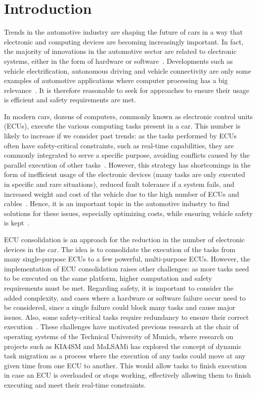 
\chapter{Introduction}\label{chap:introduction}
Trends in the automotive industry are shaping the future of cars in a way that electronic and computing devices are becoming increasingly important. In fact, the majority of innovations in the automotive sector are related to electronic systems, either in the form of hardware or software~\parencite{ey1}. Developments such as vehicle electrification, autonomous driving and vehicle connectivity are only some examples of automotive applications where computer processing has a big relevance~\parencite{pwc1}. It is therefore reasonable to seek for approaches to ensure their usage is efficient and safety requirements are met.

In modern cars, dozens of computers, commonly known as electronic control units (ECUs), execute the various computing tasks present in a car. This number is likely to increase if we consider past trends: as the tasks performed by ECUs often have safety-critical constraints, such as real-time capabilities, they are commonly integrated to serve a specific purpose, avoiding conflicts caused by the parallel execution of other tasks~\parencite{vipin1, vipin2}. However, this strategy has shortcomings in the form of inefficient usage of the electronic devices (many tasks are only executed in specific and rare situations), reduced fault tolerance if a system fails, and increased weight and cost of the vehicle due to the high number of ECUs and cables~\parencite{vipin2, baunach1}. Hence, it is an important topic in the automotive industry to find solutions for these issues, especially optimizing costs, while ensuring vehicle safety is kept~\parencite{mckinsey1}.

ECU consolidation is an approach for the reduction in the number of electronic devices in the car. The idea is to consolidate the execution of the tasks from many single-purpose ECUs to a few powerful, multi-purpose ECUs. However, the implementation of ECU consolidation raises other challenges: as more tasks need to be executed on the same platform, higher computation and safety requirements must be met. Regarding safety, it is important to consider the added complexity, and cases where a hardware or software failure occur need to be considered, since a single failure could block many tasks and cause major issues. Also, some safety-critical tasks require redundancy to ensure their correct execution~\parencite{mundhenk1}. These challenges have motivated previous research at the chair of operating systems of the Technical University of Munich, where research on projects such as KIA4SM and MaLSAMi has explored the concept of dynamic task migration as a process where the execution of any tasks could move at any given time from one ECU to another. This would allow tasks to finish execution in case an ECU is overloaded or stops working, effectively allowing them to finish executing and meet their real-time constraints.


